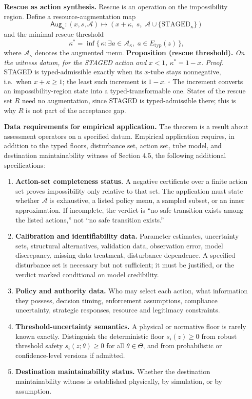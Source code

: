 \documentclass[11pt]{article}
\providecommand{\tightlist}{\setlength{\itemsep}{0pt}\setlength{\parskip}{0pt}}
\begin{document}
\textbf{Rescue as action synthesis.} Rescue is an operation on the impossibility region. Define a resource-augmentation map
\[\mathsf{Aug}_\kappa : (x, s, \mathcal{A}) \mapsto (x + \kappa,\; s,\; \mathcal{A} \cup \{\mathrm{STAGED}_\kappa\})\]
and the minimal rescue threshold
\[\kappa^* = \inf\{\, \kappa : \exists a \in \mathcal{A}_\kappa,\; a \in E_{\mathrm{typ}}(z) \,\},\]
where \(\mathcal{A}_\kappa\) denotes the augmented menu. \textbf{Proposition (rescue threshold).} \emph{On the witness datum, for the STAGED action and \(x < 1\), \(\kappa^* = 1 - x\).} \emph{Proof.} STAGED is typed-admissible exactly when its \(x\)-tube stays nonnegative, i.e.\ when \(x + \kappa \ge 1\); the least such increment is \(1 - x\). \ensuremath{\square} The increment converts an impossibility-region state into a typed-transformable one. States of the rescue set \(R\) need no augmentation, since STAGED is typed-admissible there; this is why \(R\) is not part of the acceptance gap.

\textbf{Data requirements for empirical application.} The theorem is a
result about assessment operators on a specified datum. Empirical
application requires, in addition to the typed floors, disturbance set,
action set, tube model, and destination maintainability witness of
Section 4.5, the following additional specifications:

\begin{enumerate}
\def\labelenumi{\arabic{enumi}.}
\tightlist
\item
  \textbf{Action-set completeness status.} A negative certificate over a
  finite action set proves impossibility only relative to that set. The
  application must state whether \(\mathcal{A}\) is exhaustive, a listed policy menu, a sampled subset, or an inner approximation. If incomplete, the verdict is ``no safe transition exists among the listed actions,'' not ``no safe transition exists.''
\item
  \textbf{Calibration and identifiability data.} Parameter estimates,
  uncertainty sets, structural alternatives, validation data,
  observation error, model discrepancy, missing-data treatment,
  disturbance dependence. A specified disturbance set is necessary but not sufficient; it must be justified, or the verdict marked conditional on model credibility.
\item
  \textbf{Policy and authority data.} Who may select each action, what
  information they possess, decision timing, enforcement assumptions,
  compliance uncertainty, strategic responses, resource and legitimacy
  constraints.
\item
  \textbf{Threshold-uncertainty semantics.} A physical or normative
  floor is rarely known exactly. Distinguish the deterministic floor
  \(s_i(z) \ge 0\) from robust threshold safety \(s_i(z;\theta) \ge 0\)
  for all \(\theta \in \Theta\), and from probabilistic or
  confidence-level versions if admitted.
\item
  \textbf{Destination maintainability status.} Whether the destination maintainability witness is established physically, by simulation, or by assumption.
\end{enumerate}
\end{document}
